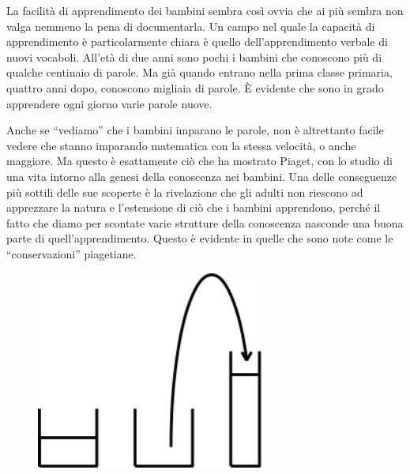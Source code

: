 La facilità di apprendimento dei bambini sembra così ovvia che ai più sembra non valga nemmeno la pena di documentarla. Un campo nel quale la capacità di apprendimento è particolarmente chiara è quello dell'apprendimento verbale di nuovi vocaboli. All'età di due anni sono pochi i bambini che conoscono più di qualche centinaio di parole. Ma già quando entrano nella prima classe primaria, quattro anni dopo, conoscono migliaia di parole. È evidente che sono in grado apprendere ogni giorno varie parole nuove.

Anche se “vediamo” che i bambini imparano le parole, non è altrettanto facile vedere che stanno imparando matematica con la stessa velocità, o anche maggiore. Ma questo è esattamente ciò che ha mostrato Piaget, con lo studio di una vita intorno alla genesi della conoscenza nei bambini. Una delle conseguenze più sottili delle sue scoperte è la rivelazione che gli adulti non riescono ad apprezzare la natura e l'estensione di ciò che i bambini apprendono, perché il fatto che diamo per scontate varie strutture della conoscenza nasconde una buona parte di quell'apprendimento. Questo è evidente in quelle che sono note come le “conservazioni” piagetiane.

\begin{figure}
   \centering
   \includegraphics[width=7.5cm]{./images/papert-1/220px-Fig-2-mindstorms.png}
   \label{Papert}
\end{figure}

